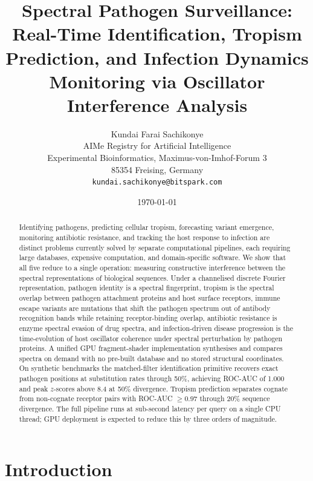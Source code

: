 \documentclass[twocolumn,11pt,a4paper]{article}
\title{\textbf{Spectral Pathogen Surveillance: Real-Time Identification,
Tropism Prediction, and Infection Dynamics Monitoring via
Oscillator Interference Analysis}}
\author{
Kundai Farai Sachikonye\\[0.3em]
AIMe Registry for Artificial Intelligence\\
Experimental Bioinformatics, Maximus-von-Imhof-Forum 3\\
85354 Freising, Germany\\
\texttt{kundai.sachikonye@bitspark.com}
}
\date{\today}
\theoremstyle{definition}
\theoremstyle{remark}
\begin{document}
\maketitle

\begin{abstract}
Identifying pathogens, predicting cellular tropism, forecasting variant
emergence, monitoring antibiotic resistance, and tracking the host response to
infection are distinct problems currently solved by separate computational
pipelines, each requiring large databases, expensive computation, and
domain-specific software. We show that all five reduce to a single operation:
measuring constructive interference between the spectral representations of
biological sequences. Under a channelised discrete Fourier representation,
pathogen identity is a spectral fingerprint, tropism is the spectral overlap
between pathogen attachment proteins and host surface receptors, immune escape
variants are mutations that shift the pathogen spectrum out of antibody
recognition bands while retaining receptor-binding overlap, antibiotic
resistance is enzyme spectral evasion of drug spectra, and infection-driven
disease progression is the time-evolution of host oscillator coherence under
spectral perturbation by pathogen proteins. A unified GPU fragment-shader
implementation synthesises and compares spectra on demand with no pre-built
database and no stored structural coordinates. On synthetic benchmarks the
matched-filter identification primitive recovers exact pathogen positions at
substitution rates through 50\%, achieving ROC-AUC of 1.000 and peak
$z$-scores above 8.4 at 50\% divergence. Tropism prediction separates cognate
from non-cognate receptor pairs with ROC-AUC $\geq 0.97$ through 20\% sequence
divergence. The full pipeline runs at sub-second latency per query on a single
CPU thread; GPU deployment is expected to reduce this by three orders of
magnitude.
\end{abstract}

\tableofcontents

\section{Introduction}
\label{sec:introduction}
\end{document}
